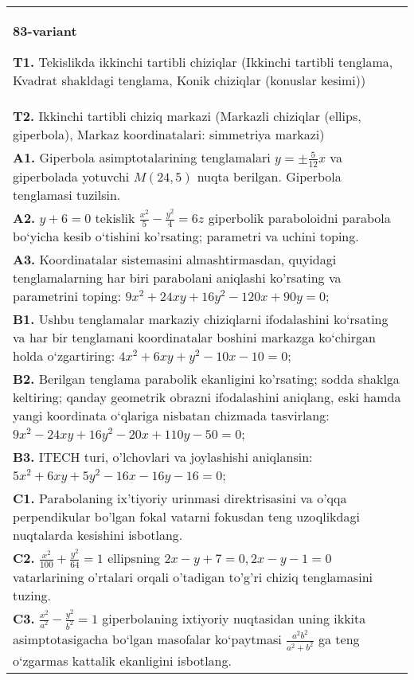 \documentclass{article}
\begin{document}
\begin{tabular}{m{17cm}}
\textbf{83-variant}
\newline

\textbf{T1.} Tekislikda ikkinchi tartibli chiziqlar (Ikkinchi tartibli tenglama, Kvadrat shakldagi tenglama, Konik chiziqlar (konuslar kesimi)) \\
\textbf{T2.} Ikkinchi tartibli chiziq markazi (Markazli chiziqlar (ellips, giperbola), Markaz koordinatalari: simmetriya markazi) \\
\textbf{A1.} Giperbola asimptotalarining tenglamalari $y= \pm \frac{5}{12} x$ va giperbolada yotuvchi $M(24,5)$ nuqta berilgan. Giperbola tenglamasi tuzilsin. \\
\textbf{A2.} $y+6=0$ tekislik $\frac{x^2}{5}-\frac{y^2}{4}=6 z$ giperbolik paraboloidni parabola bo‘yicha kesib o‘tishini ko'rsating; parametri va uchini toping. \\
\textbf{A3.} Koordinatalar sistemasini almashtirmasdan, quyidagi tenglamalarning har biri parabolani aniqlashi ko'rsating va parametrini toping: $9 x^2+24 x y+16 y^2-120 x+90 y=0$; \\
\textbf{B1.} Ushbu tenglamalar markaziy chiziqlarni ifodalashini ko‘rsating va har bir tenglamani koordinatalar boshini markazga ko‘chirgan holda o‘zgartiring: $4 x^2+6 x y+y^2-10 x-10=0$; \\
\textbf{B2.} Berilgan tenglama parabolik ekanligini ko'rsating; sodda shaklga keltiring; qanday geometrik obrazni ifodalashini aniqlang, eski hamda yangi koordinata o‘qlariga nisbatan chizmada tasvirlang: $9 x^2-24 x y+16 y^2-20 x+110 y-50=0$; \\
\textbf{B3.} ITECH turi, o'lchovlari va joylashishi aniqlansin: $5 x^2+6 x y+5 y^2-16 x-16 y-16=0$; \\
\textbf{C1.} Parabolaning ix'tiyoriy urinmasi direktrisasini va o'qqa perpendikular bo'lgan fokal vatarni fokusdan teng uzoqlikdagi nuqtalarda kesishini isbotlang. \\
\textbf{C2.} $\frac{x^2}{100}+\frac{y^2}{64}=1$ ellipsning $2 x-y+7=0,2 x-y-1=0$ vatarlarining o'rtalari orqali o'tadigan to'g'ri chiziq tenglamasini tuzing. \\
\textbf{C3.} $\frac{x^2}{a^2}-\frac{y^2}{b^2}=1$ giperbolaning ixtiyoriy nuqtasidan uning ikkita asimptotasigacha bo‘lgan masofalar ko‘paytmasi $\frac{a^2 b^2}{a^2+b^2}$ ga teng o‘zgarmas kattalik ekanligini isbotlang. \\

\end{tabular}
\vspace{1cm}
\end{document}

